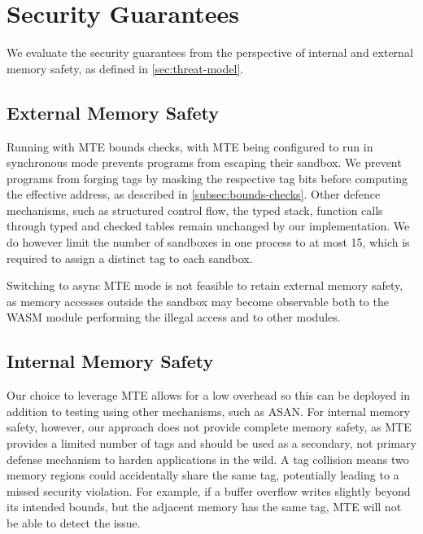 \section{Security Guarantees}\label{sec:security-guarantees}

We evaluate the security guarantees from the perspective of internal and external memory safety, as defined in \cref{sec:threat-model}.

\subsection{External Memory Safety}
\label{subsec:sec-guarantees-external-memory-safety}

Running with \ac{MTE} bounds checks, with \ac{MTE} being configured to run in synchronous mode prevents programs from escaping their sandbox.
We prevent programs from forging tags by masking the respective tag bits before computing the effective address, as described in \cref{subsec:bounds-checks}.
Other defence mechanisms, such as structured control flow, the typed stack, function calls through typed and checked tables remain unchanged by our implementation.
We do however limit the number of sandboxes in one process to at most 15, which is required to assign a distinct tag to each sandbox.

Switching to async \ac{MTE} mode is not feasible to retain external memory safety, as memory accesses outside the sandbox may become observable both to the \ac{WASM} module performing the illegal access and to other modules.

\subsection{Internal Memory Safety}
\label{subsec:sec-guarantees-internal-memory-safety}

Our choice to leverage \ac{MTE} allows for a low overhead so this can be deployed in addition to testing using other mechanisms, such as \ac{ASAN}.
For internal memory safety, however, our approach does not provide complete memory safety, as \ac{MTE} provides a limited number of tags and should be used as a secondary, not primary defense mechanism to harden applications in the wild.
A tag collision means two memory regions could accidentally share the same tag, potentially leading to a missed security violation.
For example, if a buffer overflow writes slightly beyond its intended bounds, but the adjacent memory has the same tag, \ac{MTE} will not be able to detect the issue.

